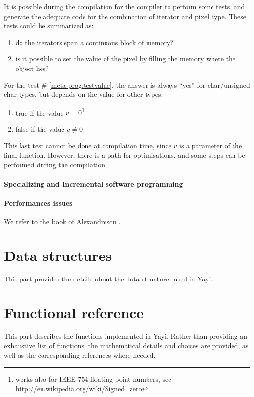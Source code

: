\documentclass[a4paper, fleqn, 10pt]{book}
\theoremstyle{break}
\begin{document}
It is possible during the compilation for the compiler to perform some tests, and generate the adequate code for the combination of iterator and pixel type. These tests could be summarized as:
\begin{enumerate}
\item do the iterators span a continuous block of memory?
\item is it possible to set the value of the pixel by filling the memory where the object lies? \label{meta-prog:testvalue}
\end{enumerate}

For the test \# \ref{meta-prog:testvalue}, the answer is always ``yes'' for char/unsigned char types, but depends on the value for other types. 
\begin{enumerate}
\item true if the value $v = 0$\footnote{works also for IEEE-754 floating point numbers, see \url{http://en.wikipedia.org/wiki/Signed_zero}}
\item false if the value $v \neq 0$
\end{enumerate}
This last test cannot be done at compilation time, since $v$ is a parameter of the final function. However, there is a path for optimisations, and some steps can be performed during the compilation. 


\subsection{Specializing and Incremental software programming}


\subsection{Performances issues}

 We refer to the book of Alexandrescu \cite{alexandrescu_a_moderncpp}. 







\part{Data structures}

This part provides the details about the data structures used in Yayi. 





\part{Functional reference}
This part describes the functions implemented in Yayi. Rather than providing an exhaustive list of functions, the mathematical details and choices are provided, as well as the corresponding references where needed. 
\end{document}
